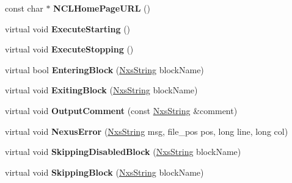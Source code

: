 \begin{DoxyCompactItemize}
\item 
\hypertarget{classNxsReader_a247cad6e4eeaf06ddeffed70dd6e9b5b}{
const char $\ast$ {\bfseries NCLHomePageURL} ()}
\label{classNxsReader_a247cad6e4eeaf06ddeffed70dd6e9b5b}

\item 
\hypertarget{classNxsReader_ad4468971caafbaa4e17e27ec47174cdd}{
virtual void {\bfseries ExecuteStarting} ()}
\label{classNxsReader_ad4468971caafbaa4e17e27ec47174cdd}

\item 
\hypertarget{classNxsReader_a73220bf4a4db2c3083ba30031972cf02}{
virtual void {\bfseries ExecuteStopping} ()}
\label{classNxsReader_a73220bf4a4db2c3083ba30031972cf02}

\item 
\hypertarget{classNxsReader_a64c3828e9f7ec7061c1a9b7c31b2b783}{
virtual bool {\bfseries EnteringBlock} (\hyperlink{classNxsString}{NxsString} blockName)}
\label{classNxsReader_a64c3828e9f7ec7061c1a9b7c31b2b783}

\item 
\hypertarget{classNxsReader_a6cbf692997601704d4b349108ccaee1a}{
virtual void {\bfseries ExitingBlock} (\hyperlink{classNxsString}{NxsString} blockName)}
\label{classNxsReader_a6cbf692997601704d4b349108ccaee1a}

\item 
\hypertarget{classNxsReader_a86147e9167f9994866f4ba0b34ad0775}{
virtual void {\bfseries OutputComment} (const \hyperlink{classNxsString}{NxsString} \&comment)}
\label{classNxsReader_a86147e9167f9994866f4ba0b34ad0775}

\item 
\hypertarget{classNxsReader_a285ef73c2126ba6ae25d43d95e0ad766}{
virtual void {\bfseries NexusError} (\hyperlink{classNxsString}{NxsString} msg, file\_\-pos pos, long line, long col)}
\label{classNxsReader_a285ef73c2126ba6ae25d43d95e0ad766}

\item 
\hypertarget{classNxsReader_aafc8e7cb840dcc4ded6bcf0a85c4375e}{
virtual void {\bfseries SkippingDisabledBlock} (\hyperlink{classNxsString}{NxsString} blockName)}
\label{classNxsReader_aafc8e7cb840dcc4ded6bcf0a85c4375e}

\item 
\hypertarget{classNxsReader_aa99f543d61a8ed69b1ce4428569ac2a2}{
virtual void {\bfseries SkippingBlock} (\hyperlink{classNxsString}{NxsString} blockName)}
\label{classNxsReader_aa99f543d61a8ed69b1ce4428569ac2a2}

\end{DoxyCompactItemize}

